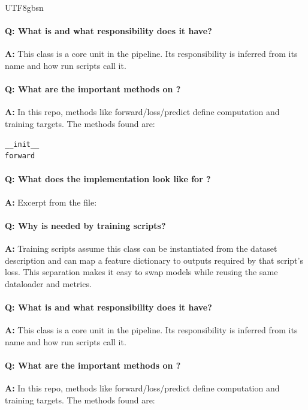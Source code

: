\documentclass[11pt]{article}
\begin{document}
\begin{CJK*}{UTF8}{gbsn}
\paragraph{Q: What is \texttt{} and what responsibility does it have?}
\textbf{A:} This class is a core unit in the pipeline. Its responsibility is inferred from its name and how run scripts call it.

\paragraph{Q: What are the important methods on \texttt{}?}
\textbf{A:} In this repo, methods like forward/loss/predict define computation and training targets. The methods found are:

\begin{Verbatim}[fontsize=\small]
__init__
forward
\end{Verbatim}

\paragraph{Q: What does the implementation look like for \texttt{}?}
\textbf{A:} Excerpt from the file:

\vspace{1mm}


\paragraph{Q: Why is \texttt{} needed by training scripts?}
\textbf{A:} Training scripts assume this class can be instantiated from the dataset description and can map a feature dictionary to outputs required by that script's loss. This separation makes it easy to swap models while reusing the same dataloader and metrics.

\paragraph{Q: What is \texttt{} and what responsibility does it have?}
\textbf{A:} This class is a core unit in the pipeline. Its responsibility is inferred from its name and how run scripts call it.

\paragraph{Q: What are the important methods on \texttt{}?}
\textbf{A:} In this repo, methods like forward/loss/predict define computation and training targets. The methods found are:


\end{CJK*}
\end{document}
